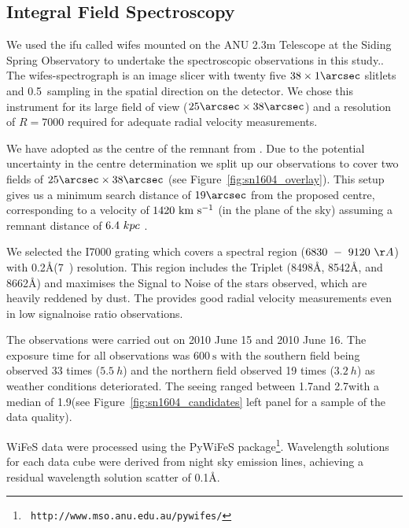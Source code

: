 \documentclass[preprint2]{aastex}
\begin{document}
\subsection{Integral Field Spectroscopy}
We used the \gls{ifu} called \gls{wifes} mounted on the ANU 2.3m Telescope at the Siding Spring Observatory  to undertake the spectroscopic observations in this study.. The \gls{wifes}-spectrograph is an image slicer with twenty five $38\times 1\arcsec$ slitlets and 0.5\arcsec\ sampling in the spatial direction on the detector. We chose this instrument for its large field of view ($25\arcsec\times38\arcsec$) and a resolution of $R=7000$ required for adequate radial velocity measurements. 

We have adopted   as the centre of the remnant from \citet{2008ApJ...689..225K}. Due to the potential uncertainty in the centre determination \citep[for a more detailed discussion about the difficulty of centre determination see Section~2.2 in][]{2012ApJ...759....7K} we split up our observations to cover two fields of $25\arcsec\times38\arcsec$ (see Figure~\ref{fig:sn1604_overlay}). This setup gives us a minimum search distance of $19\arcsec$ from the proposed centre, corresponding to a velocity of $1420~\textrm{km}~\textrm{s}^{-1}$ (in the plane of the sky) assuming a remnant distance of $6.4~kpc$ \citep{2012A&A...537A.139C}. 



We selected the I7000 grating which covers a spectral region  ($6830~-~9120~\AA$) with 0.2\AA (7~\kms) resolution. This region includes the  Triplet (8498\AA, 8542\AA, and 8662\AA) and maximises the Signal to Noise of the stars observed, which are heavily reddened by dust. The  provides good radial velocity measurements even in low \gls{signalnoise} ratio observations.

The observations were carried out  on 2010 June 15 and 2010 June 16. The exposure time for all observations was $600~\textrm{s}$ with the southern field being observed 33 times ($5.5~h$) and the northern field observed 19 times ($3.2~h$) as weather conditions deteriorated. 
The seeing ranged between 1.7\arcsec and 2.7\arcsec with a median of 1.9\arcsec (see Figure~\ref{fig:sn1604_candidates} left panel for a sample of the data quality). 

%




WiFeS data were processed using the PyWiFeS package\footnote[1]{{\tt
http://www.mso.anu.edu.au/pywifes/}}.  Wavelength solutions for each
data cube were derived from night sky emission lines, achieving a
residual wavelength solution scatter of 0.1\AA.
\end{document}
